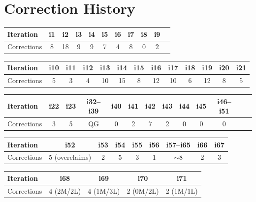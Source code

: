 \documentclass[11pt,a4paper]{article}
\begin{document}
\section{Correction History}

\begin{center}
\begin{tabular}{lcccccccccc}
\toprule
Iteration & i1 & i2 & i3 & i4 & i5 & i6 & i7 & i8 & i9 \\
\midrule
Corrections & 8 & 18 & 9 & 9 & 7 & 4 & 8 & 0 & 2 \\
\bottomrule
\end{tabular}
\end{center}

\begin{center}
\begin{tabular}{lcccccccccccc}
\toprule
Iteration & i10 & i11 & i12 & i13 & i14 & i15 & i16 & i17 & i18 & i19 & i20 & i21 \\
\midrule
Corrections & 5 & 3 & 4 & 10 & 15 & 8 & 12 & 10 & 6 & 12 & 8 & 5 \\
\bottomrule
\end{tabular}
\end{center}

\begin{center}
\begin{tabular}{lcccccccccccc}
\toprule
Iteration & i22 & i23 & i32--i39 & i40 & i41 & i42 & i43 & i44 & i45 & i46--i51 \\
\midrule
Corrections & 3 & 5 & QG & 0 & 2 & 7 & 2 & 0 & 0 & 0 \\
\bottomrule
\end{tabular}
\end{center}

\begin{center}
\begin{tabular}{lcccccccc}
\toprule
Iteration & i52 & i53 & i54 & i55 & i56 & i57--i65 & i66 & i67 \\
\midrule
Corrections & 5 (overclaims) & 2 & 5 & 3 & 1 & $\sim$8 & 2 & 3 \\
\bottomrule
\end{tabular}
\end{center}

\begin{center}
\begin{tabular}{lcccc}
\toprule
Iteration & i68 & i69 & i70 & i71 \\
\midrule
Corrections & 4 (2M/2L) & 4 (1M/3L) & 2 (0M/2L) & 2 (1M/1L) \\
\bottomrule
\end{tabular}
\end{center}
\end{document}
